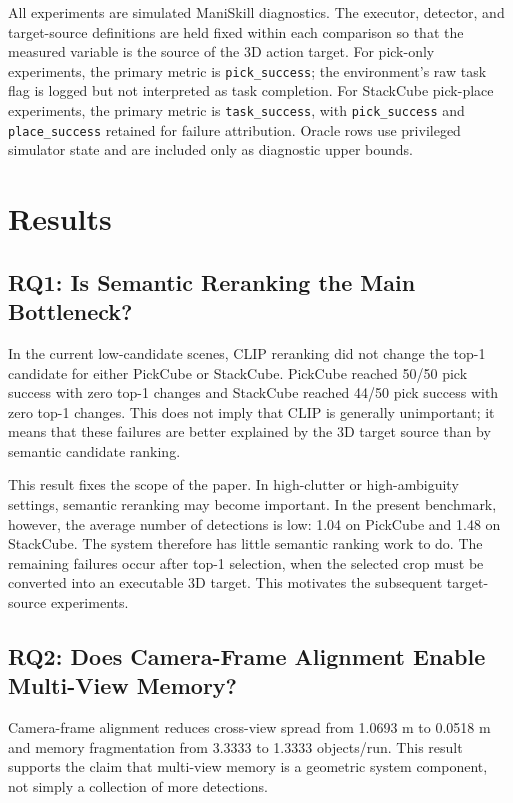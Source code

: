 \documentclass[preprint,12pt]{elsarticle}
\begin{document}
All experiments are simulated ManiSkill diagnostics. The executor, detector,
and target-source definitions are held fixed within each comparison so that
the measured variable is the source of the 3D action target. For pick-only
experiments, the primary metric is \texttt{pick\_success}; the environment's
raw task flag is logged but not interpreted as task completion. For StackCube
pick-place experiments, the primary metric is \texttt{task\_success}, with
\texttt{pick\_success} and \texttt{place\_success} retained for failure
attribution. Oracle rows use privileged simulator state and are included only
as diagnostic upper bounds.

\section{Results}

\subsection{RQ1: Is Semantic Reranking the Main Bottleneck?}

In the current low-candidate scenes, CLIP reranking did not change the top-1
candidate for either PickCube or StackCube. PickCube reached 50/50 pick success
with zero top-1 changes and StackCube reached 44/50 pick success with zero
top-1 changes. This does not imply that CLIP is generally unimportant; it means
that these failures are better explained by the 3D target source than by
semantic candidate ranking.

This result fixes the scope of the paper. In high-clutter or high-ambiguity
settings, semantic reranking may become important. In the present benchmark,
however, the average number of detections is low: 1.04 on PickCube and 1.48 on
StackCube. The system therefore has little semantic ranking work to do. The
remaining failures occur after top-1 selection, when the selected crop must be
converted into an executable 3D target. This motivates the subsequent
target-source experiments.

\subsection{RQ2: Does Camera-Frame Alignment Enable Multi-View Memory?}

Camera-frame alignment reduces cross-view spread from 1.0693 m to 0.0518 m and
memory fragmentation from 3.3333 to 1.3333 objects/run. This result supports
the claim that multi-view memory is a geometric system component, not simply a
collection of more detections.
\end{document}
